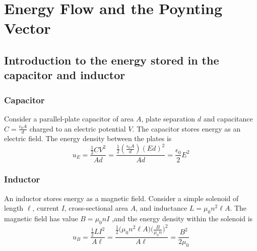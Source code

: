 \documentclass[12pt]{article}
\numberwithin{equation}{section}
\begin{document}
\newpage
\section{Energy Flow and the Poynting Vector}
\subsection{Introduction to the energy stored in the capacitor and inductor}
\subsubsection{Capacitor}
Consider a parallel-plate capacitor of area $A$, plate separation $d$ and capacitance $C=\frac{\epsilon_0 A}{d}$ charged to an electric potential $V$. The capacitor stores energy as an electric field. The energy density between the plates is
\begin{equation}
    u_E=\frac{\frac{1}{2}CV^2}{Ad}=\frac{\frac{1}{2}(\frac{\epsilon_0A}{d})(Ed)^2}{Ad}=\frac{\epsilon_0}{2}E^2\label{41}
\end{equation}
\subsubsection{Inductor}
An inductor stores energy as a magnetic field. Consider a simple solenoid of length $\ell$, current $I$, cross-sectional area $A$, and inductance $L=\mu_0n^2\ell A$. The magnetic field has value $B=\mu_0nI$ ,and the energy density within the solenoid is 
\begin{equation}
    u_B=\frac{\frac{1}{2}LI^2}{A\ell}=\frac{\frac{1}{2}\big(\mu_0n^2\ell A\big)\big(\frac{B}{\mu_0n}\big)^2}{A\ell}=\frac{B^2}{2\mu_0}\label{42}
\end{equation} 
\end{document}
